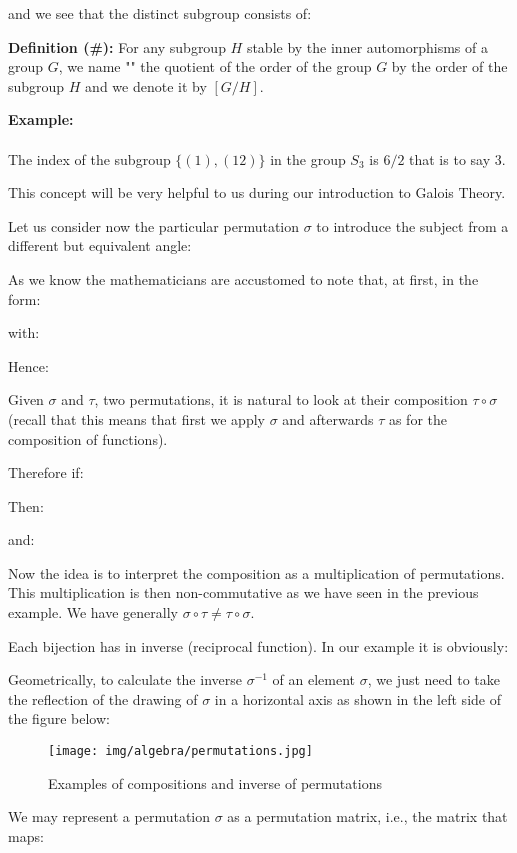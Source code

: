	and we see that the distinct subgroup consists of:
	
	\textbf{Definition (\#\mydef):} For any subgroup $H$ stable by the inner automorphisms of a group $G$, we name "" the quotient of the order of the group $G$ by the order of the subgroup $H$ and we denote it by $[G / H]$.
	
	\begin{tcolorbox}[colframe=black,colback=white,sharp corners]
	\textbf{{\Large {}}Example:}\\\\
	The index of the subgroup $\{(1), (1 2)\}$ in the group $S_3$ is $6/2$ that is to say $3$.
	\end{tcolorbox}
	 This concept will be very helpful to us during our introduction to Galois Theory.
	
	Let us consider now the particular permutation $\sigma$ to introduce the subject from a different but equivalent angle:
	
	As we know the mathematicians are accustomed to note that, at first, in the form:
	 
	with:
	
	Hence:
	 
	Given $\sigma$ and $\tau$, two permutations, it is natural to look at their composition $\tau\circ \sigma$  (recall that this means that first we apply $\sigma$ and afterwards $\tau$ as for the composition of functions).
	
	Therefore if:
	
	Then:
	
	and:
	
	Now the idea is to interpret the composition as a multiplication of permutations. This multiplication is then non-commutative as we have seen in the previous example. We have generally $\sigma \circ \tau \neq \tau \circ \sigma$.
	
	Each bijection has in inverse (reciprocal function). In our example it is obviously:
	
	Geometrically, to calculate the inverse $\sigma^{-1}$ of an element $\sigma$, we just need to take the reflection of the drawing of $\sigma$ in a horizontal axis as shown in the left side of the figure below:
	\begin{figure}[H]
		\centering
		\texttt{[image: img/algebra/permutations.jpg]}
		\caption{Examples of compositions and inverse of permutations}
	\end{figure}
	We may represent a permutation $\sigma$ as a permutation matrix, i.e., the matrix that maps:
	
